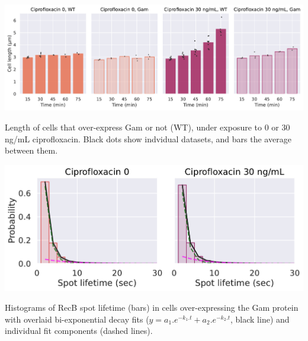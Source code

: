 
\begin{suppfigure*}[htbp]
    \begin{center}
    \includegraphics[width=\linewidth]{SI_Figures/Cell_length_Gam.pdf}
    \end{center}
    \caption{Length of cells that over-express Gam or not (WT), under exposure to 0 or 30 ng/mL ciprofloxacin. Black dots show indvidual datasets, and bars the average between them.}
    \label{SIFig:Gam_cell_length}
\end{suppfigure*}

\begin{suppfigure*}[htbp]
    \begin{center}
    \includegraphics[width=\linewidth]{SI_Figures/Gam_lifetimes_fits.pdf}
    \end{center}
    \caption{Histograms of RecB spot lifetime (bars) in cells over-expressing the Gam protein with overlaid bi-exponential decay fits ($y=a_1.e^{-k_1.t} + a_2.e^{-k_2.t}$, black line) and individual fit components (dashed lines).}
    \label{SIFig:Gam_RecB_lifetimes_fits}
\end{suppfigure*}

